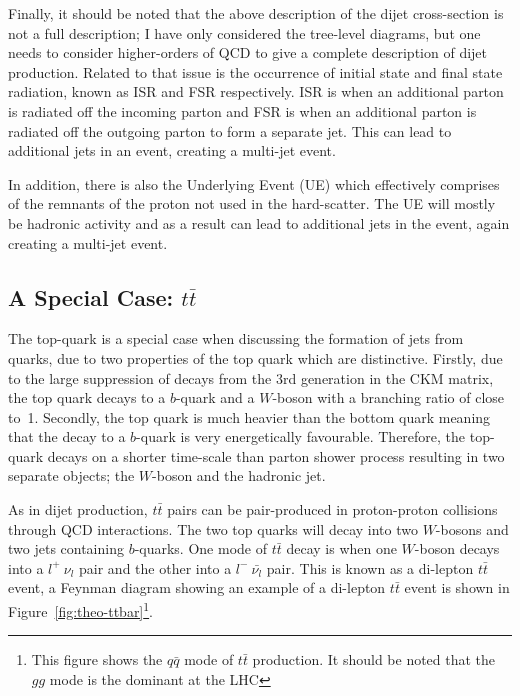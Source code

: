 Finally, it should be noted that the above description of the dijet cross-section is
not a full description; I have only considered the tree-level diagrams, 
but one needs to consider higher-orders of QCD to give a complete description of dijet production.
Related to that issue is the occurrence of initial state and final state radiation, known as ISR and FSR respectively.
ISR is when an additional parton is radiated off the incoming parton and FSR is when an additional parton is radiated off the outgoing parton to form a separate jet.
This can lead to additional jets in an event, creating a multi-jet event.

In addition, there is also the Underlying Event (UE) which effectively comprises of the remnants of the proton not used in the hard-scatter.
The UE will mostly be hadronic activity and as a result can lead to additional jets in the event, again creating a multi-jet event.

\subsection{A Special Case: $t\bar{t}$}
\label{sec:theo-ttbar}

The top-quark is a special case when discussing the formation of jets from quarks,
due to two properties of the top quark which are distinctive.
Firstly, due to the large suppression of decays from the 3rd generation in the CKM matrix,
the top quark decays to a $b$-quark and a $W$-boson with a branching ratio of close to~1.
Secondly, the top quark is much heavier than the bottom quark
meaning that the decay to a $b$-quark is very energetically favourable.
Therefore, the top-quark decays on a shorter time-scale than parton shower process
resulting in two separate objects; the $W$-boson and the hadronic jet.

As in dijet production, $t\bar{t}$ pairs can be pair-produced in proton-proton collisions through QCD interactions.
The two top quarks will decay into two $W$-bosons and two jets containing $b$-quarks.
One mode of $t\bar{t}$ decay is when one $W$-boson decays into a $l^+~\nu_l$ pair and the other into a $l^{-}~\bar{\nu_l}$ pair.
This is known as a di-lepton $t\bar{t}$ event, a Feynman diagram showing an example of a di-lepton $t\bar{t}$ event is shown in
Figure~\ref{fig:theo-ttbar}\footnote{This figure shows the $q\bar{q}$ mode of $t\bar{t}$ production. It should be noted that the $gg$ mode is the dominant at the LHC}.

